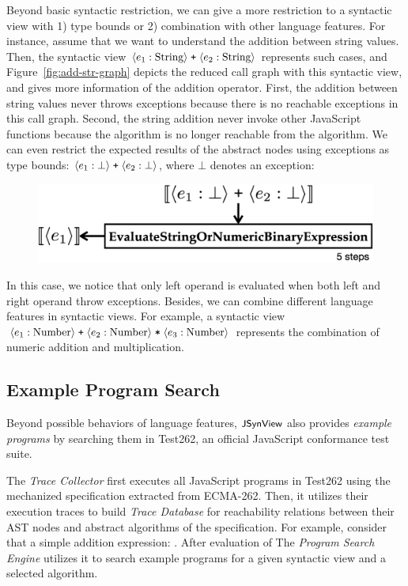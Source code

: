 Beyond basic syntactic restriction, we can give a more restriction to a
syntactic view with 1) type bounds or 2) combination with other language
features.  For instance, assume that we want to understand the addition between
string values.  Then, the syntactic view $\langle e_1: \text{String} \rangle \;
\texttt{+} \; \langle e_2: \text{String} \rangle$ represents such cases, and
Figure~\ref{fig:add-str-graph} depicts the reduced call graph with this syntactic
view, and gives more information of the addition operator.  First, the addition
between string values never throws exceptions because there is no reachable
exceptions in this call graph.  Second, the string addition never invoke other
JavaScript functions because the  algorithm is no longer reachable
from the  algorithm.  We can even restrict the expected
results of the abstract nodes using exceptions as type bounds: $\langle e_1:
\bot \rangle \; \texttt{+} \; \langle e_2: \bot \rangle$, where $\bot$ denotes an exception:
\begin{figure}[H]
  \centering
  \includegraphics[width=.7\columnwidth]{img/add-exc.png}
\end{figure} \noindent
In this case, we notice that only left operand is evaluated when both left and
right operand throw exceptions.  Besides, we can combine different language
features in syntactic views.  For example, a syntactic view $\langle e_1:
\text{Number} \rangle \; \texttt{+} \; \langle e_2: \text{Number} \rangle \; \texttt{*} \;
\langle e_3: \text{Number} \rangle$ represents the combination of numeric addition
and multiplication.





\subsection{Example Program Search}\label{sec:reduce-spec}

Beyond possible behaviors of language features, $\textsf{\small JSynView}$ also provides
\textit{example programs} by searching them in Test262, an official JavaScript
conformance test suite.

The \textit{Trace Collector} first executes all JavaScript programs in Test262
using the mechanized specification extracted from ECMA-262.  Then, it utilizes
their execution traces to build \textit{Trace Database} for reachability
relations between their AST nodes and abstract algorithms of the specification.
For example, consider that a simple addition expression: .  After
evaluation of 
The \textit{Program Search Engine} utilizes it to search example programs for a
given syntactic view and a selected algorithm.


